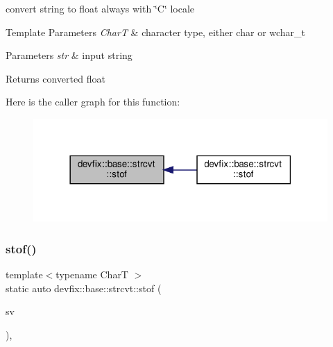 convert string to float always with \char`\"{}\+C\char`\"{} locale 


\begin{DoxyTemplParams}{Template Parameters}
{\em CharT} & character type, either \textquotesingle{}char\textquotesingle{} or \textquotesingle{}wchar\+\_\+t\textquotesingle{} \\
\hline
\end{DoxyTemplParams}

\begin{DoxyParams}{Parameters}
{\em str} & input string \\
\hline
\end{DoxyParams}
\begin{DoxyReturn}{Returns}
converted float 
\end{DoxyReturn}
Here is the caller graph for this function\+:\nopagebreak
\begin{figure}[H]
\begin{center}
\leavevmode
\includegraphics[width=318pt]{structdevfix_1_1base_1_1strcvt_a5b28d529cfbbf026c8e1550e92e2e557_icgraph}
\end{center}
\end{figure}
\mbox{\label{structdevfix_1_1base_1_1strcvt_ad124ced1e4a75974cdf8065985028265}} 
\subsubsection{\texorpdfstring{stof()}{stof()}\hspace{0.1cm}{\footnotesize\ttfamily [2/2]}}
{\footnotesize\ttfamily template$<$typename CharT $>$ \\
static auto devfix\+::base\+::strcvt\+::stof (\begin{DoxyParamCaption}\item[{std\+::basic\+\_\+string\+\_\+view$<$ CharT $>$}]{sv }\end{DoxyParamCaption})\hspace{0.3cm}{\ttfamily [inline]}, {\ttfamily [static]}}



